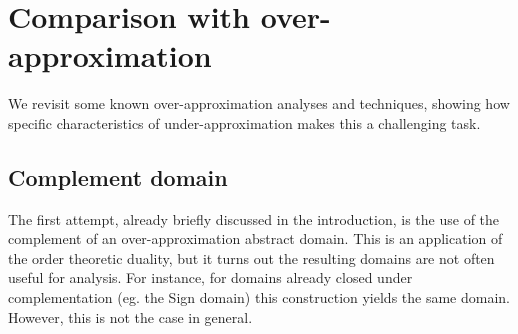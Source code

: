 \section{Comparison with over-approximation}\label{sec:uai:examples}
We revisit some known over-approximation analyses and techniques, showing how specific characteristics of under-approximation makes this a challenging task.

\subsection*{Complement domain}
The first attempt, already briefly discussed in the introduction, is the use of the complement of an over-approximation abstract domain. This is an application of the order theoretic duality, but it turns out the resulting domains are not often useful for analysis. For instance, for domains already closed under complementation (eg. the Sign domain) this construction yields the same domain. However, this is not the case in general.

